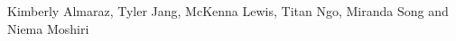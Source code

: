\documentclass[twocolumn]{bmcart}%
\begin{document}
\begin{backmatter}
    Kimberly Almaraz, Tyler Jang, McKenna Lewis, Titan Ngo, Miranda Song and Niema Moshiri
    




%


\end{backmatter}
\end{document}

